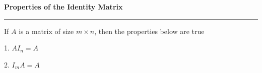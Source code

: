 \nopagenumbers
{\bf Properties of the Identity Matrix}
\vskip 1mm
\hrule

\vskip 6pt
If $A$ is a matrix of size $m\times n$, then the properties below are true

\vskip 6pt
1. $AI_n=A$

\vskip 6pt
2. $I_mA=A$

\vfill\eject
\bye
